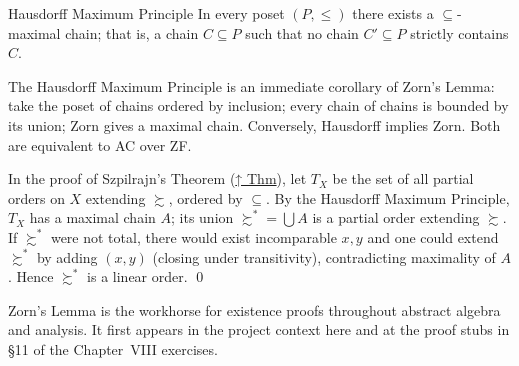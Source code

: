 \begin{theorembox}{Hausdorff Maximum Principle}
\label{thm:hausdorff}
In every poset $(P, \leq)$ there exists a $\subseteq$-maximal chain; that
is, a chain $C \subseteq P$ such that no chain $C' \subseteq P$ strictly
contains $C$.
\end{theorembox}

\begin{remark*}
The Hausdorff Maximum Principle is an immediate corollary of Zorn's Lemma:
take the poset of chains ordered by inclusion; every chain of chains is
bounded by its union; Zorn gives a maximal chain. Conversely, Hausdorff
implies Zorn. Both are equivalent to AC over ZF.
\end{remark*}

\begin{remark*}
In the proof of Szpilrajn's Theorem (\hyperref[thm:szpilrajn]{↑ Thm}), let
$T_X$ be the set of all partial orders on $X$ extending $\succsim$, ordered
by $\subseteq$. By the Hausdorff Maximum Principle, $T_X$ has a maximal chain
$A$; its union $\succsim^* = \bigcup A$ is a partial order extending
$\succsim$. If $\succsim^*$ were not total, there would exist incomparable
$x, y$ and one could extend $\succsim^*$ by adding $(x,y)$ (closing under
transitivity), contradicting maximality of $A$. Hence $\succsim^*$ is a
linear order. \qed
\end{remark*}

\begin{remark*}[Transition]
Zorn's Lemma is the workhorse for existence proofs throughout abstract
algebra and analysis. It first appears in the project context here and at
the proof stubs in \S11 of the Chapter~VIII exercises.
\end{remark*}

